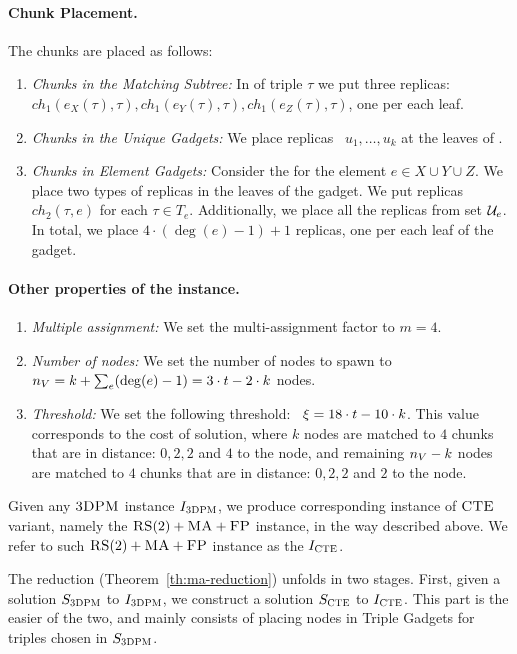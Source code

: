 \paragraph{Chunk Placement.}
The chunks are placed as follows:
\begin{enumerate}
  \item \emph{Chunks in the Matching Subtree:} In {\TripleGadget} of triple $\tau$ we put
  three replicas:
 ~$ch_1(e_X(\tau), \tau), ch_1(e_Y(\tau), \tau), ch_1(e_Z(\tau), \tau)$, one per each leaf.
  \item \emph{Chunks in the Unique Gadgets:} We place replicas
 ~$u_1,\ldots, u_k$ at the leaves of \UnqGadgets.
 \item \emph{Chunks in Element Gadgets:} Consider the \ElGadget{} for the element $e \in X\cup Y\cup Z$.
 We place two types of replicas in the leaves of the gadget.
 We put replicas $ch_2(\tau, e)$ for each $\tau \in T_e$.
 Additionally, we place all the replicas from set ${\mathcal{U}_e}$.
 In total, we place $4\cdot (\deg(e) - 1) + 1$ replicas, one per each leaf of the gadget.
\end{enumerate}

\paragraph{Other properties of the instance.}
\begin{enumerate}
  \item \emph{Multiple assignment:} We set the multi-assignment factor to $m=4$.
  \item \emph{Number of nodes:} We set the number of nodes to spawn to
 ~$n_V = k + \sum_{e}(\deg(e)-1) = 3\cdot t - 2\cdot k$ nodes.
 \item \emph{Threshold:} We set the following threshold:
 ~$\xi = 18\cdot t - 10\cdot k$.
 This value corresponds to the cost of solution, where $k$ nodes are matched to $4$ chunks that are in distance: $0, 2, 2$ and $4$ to the node, and remaining $n_V-k$ nodes are matched to $4$ chunks that are in distance: $0, 2, 2$ and $2$ to the node.
\end{enumerate}


Given any $\textsc{3DPM}$ instance $I_{\mathrm{\textsc{3DPM}}}$, we produce corresponding instance of $\textsc{CTE}$ variant, namely the $\textsc{RS}(2)+\textsc{MA}+\textsc{FP}$ instance, in the way described above.
We refer to such $\textsc{RS}(2)+\textsc{MA}+\textsc{FP}$ instance as the $I_{\mathrm{\textsc{CTE}}}$.

The reduction (Theorem~\ref{th:ma-reduction}) unfolds in two stages.
First, given a solution $S_{\mathrm{\textsc{3DPM}}}$ to $I_{\mathrm{\textsc{3DPM}}}$, we construct a solution $S_{\mathrm{\textsc{CTE}}}$ to $I_{\mathrm{\textsc{CTE}}}$.
This part is the easier of the two, and mainly consists of placing nodes in Triple Gadgets for triples chosen in $S_{\mathrm{\textsc{3DPM}}}$.

